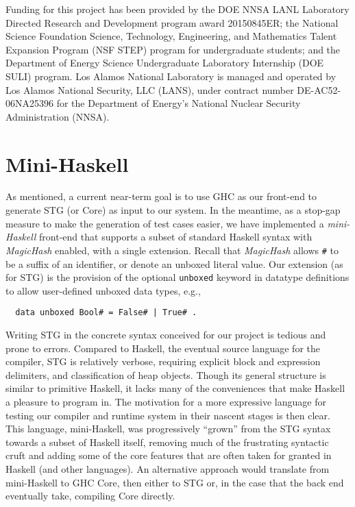 \documentclass{llncs}
\begin{document}
Funding for this project has been provided by the DOE NNSA LANL Laboratory
Directed Research and Development program award 20150845ER; the National
Science Foundation Science, Technology, Engineering, and Mathematics Talent
Expansion Program (NSF STEP) program for undergraduate students; and the Department of Energy
Science Undergraduate Laboratory Internship (DOE SULI) program.
%
Los Alamos National Laboratory is managed and operated by Los Alamos National
Security, LLC (LANS), under contract number DE-AC52-06NA25396 for the
Department of Energy's National Nuclear Security Administration (NNSA).


%
%

\appendix

\section{Mini-Haskell}
\label{app:minihaskell}
As mentioned, a current near-term goal is to use GHC as our front-end to
generate STG (or Core) as input to our system.  In the meantime, as a stop-gap
measure to make the generation of test cases easier, we have implemented a
\emph{mini-Haskell} front-end that supports a subset of standard Haskell
syntax with \emph{MagicHash} enabled, with a single extension.  Recall that
\emph{MagicHash} allows \texttt{\#} to be a suffix of an identifier, or denote
an unboxed literal value.  Our extension (as for STG) is the provision of
the optional \texttt{unboxed} keyword in datatype definitions to allow
user-defined unboxed data types, e.g.,
{\footnotesize
\begin{verbatim}
  data unboxed Bool# = False# | True# .
\end{verbatim}}

Writing STG in the concrete syntax conceived for our project is tedious and
prone to errors.  Compared to Haskell, the eventual source language for the
compiler, STG is relatively verbose, requiring explicit block and expression
delimiters, and classification of heap objects. Though its general structure
is similar to primitive Haskell, it lacks many of the conveniences that make
Haskell a pleasure to program in.  The motivation for a more expressive
language for testing our compiler and runtime system in their nascent stages
is then clear.  This language, mini-Haskell, was progressively ``grown'' from
the STG syntax towards a subset of Haskell itself, removing much of the
frustrating syntactic cruft and adding some of the core features that are
often taken for granted in Haskell (and other languages).  An alternative
approach would translate from mini-Haskell to GHC Core, then either to STG or,
in the case that the back end eventually take, compiling Core directly.
\end{document}
